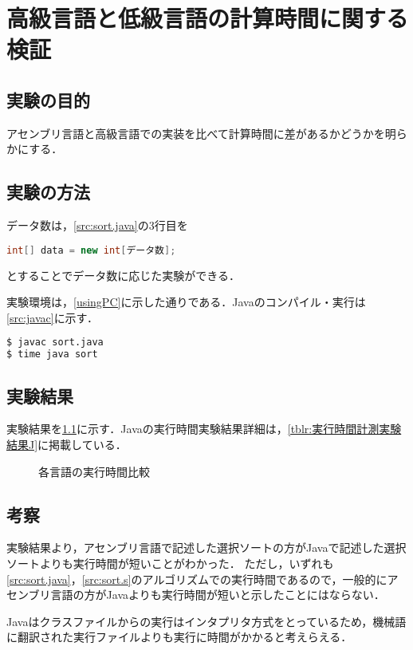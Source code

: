 \chapter{高級言語と低級言語の計算時間に関する検証}\label{chap4}
\section{実験の目的}
アセンブリ言語と高級言語での実装を比べて計算時間に差があるかどうかを明らかにする．
\section{実験の方法}
データ数は，\ref{src:sort.java}の3行目を
\begin{lstlisting}[caption={}, label={}, language={Java}, frame={none},numbers={none}]
int[] data = new int[データ数];
\end{lstlisting}
とすることでデータ数に応じた実験ができる．\par
実験環境は，\ref{usingPC}に示した通りである．{\ttfamily Java}のコンパイル・実行は\ref{src:javac}に示す．
\begin{lstlisting}[caption={{\ttfamily Java}コンパイル・実行時間の計測}, label={src:javac}, language={Bash},frame={single},numbers={none}]
$ javac sort.java
$ time java sort
\end{lstlisting}
\section{実験結果}
実験結果を\ref{fig:比較}に示す．{\ttfamily Java}の実行時間実験結果詳細は，\ref{tblr:実行時間計測実験結果J}に掲載している．
\begin{figure}[htb]
    \centering
    \caption{各言語の実行時間比較}
    \label{fig:比較}
\end{figure}
\section{考察}
実験結果より，アセンブリ言語で記述した選択ソートの方が{\ttfamily Java}で記述した選択ソートよりも実行時間が短いことがわかった．
ただし，いずれも\ref{src:sort.java}，\ref{src:sort.s}のアルゴリズムでの実行時間であるので，一般的にアセンブリ言語の方が{\ttfamily Java}よりも実行時間が短いと示したことにはならない．\par
{\ttfamily Java}はクラスファイルからの実行はインタプリタ方式をとっているため，機械語に翻訳された実行ファイルよりも実行に時間がかかると考えらえる．